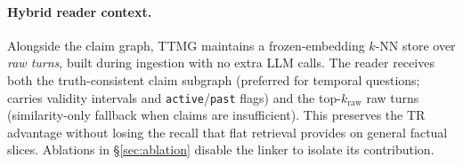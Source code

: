 \paragraph{Hybrid reader context.}
Alongside the claim graph, TTMG maintains a frozen-embedding $k$-NN
store over \emph{raw turns}, built during ingestion with no extra LLM
calls. The reader receives both the truth-consistent claim subgraph
(preferred for temporal questions; carries validity intervals and
\texttt{active}/\texttt{past} flags) and the top-$k_{\text{raw}}$
raw turns (similarity-only fallback when claims are insufficient).
This preserves the TR advantage without losing the recall that flat
retrieval provides on general factual slices. Ablations in
\S\ref{sec:ablation} disable the linker to isolate its contribution.
